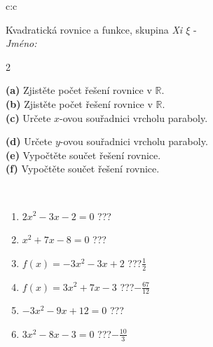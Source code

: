 \documentclass[10pt]{report}
\begin{document}
\begin{tabular}{c:c}
\begin{minipage}[c][104.5mm][t]{0.5\linewidth}
\begin{center}
\vspace{7mm}
{\huge \LARGE Kvadratická rovnice a funkce, skupina \textit{Xi $\xi$} -}\\[5mm]
\textit{Jméno:}\phantom{xxxxxxxxxxxxxxxxxxxxxxxxxxxxxxxxxxxxxxxxxxxxxxxxxxxxxxxxxxxxxxxxx}\\[5mm]
\begin{minipage}{0.95\linewidth}
\begin{center}
{\small \begin{multicols}{2} \raggedright
\textbf{(a)} Zjistěte počet řešení rovnice v \(\mathbb{R}\). \\[1mm]
\textbf{(b)} Zjistěte počet řešení rovnice v \(\mathbb{R}\). \\[1mm]
\textbf{(c)} Určete \(x\)-ovou souřadnici vrcholu paraboly. \par \columnbreak
\textbf{(d)} Určete \(y\)-ovou souřadnici vrcholu paraboly. \\[1mm]
\textbf{(e)} Vypočtěte součet řešení rovnice. \\[1mm]
\textbf{(f)} Vypočtěte součet řešení rovnice.
\end{multicols}
}
\end{center}
\end{minipage}
\\[4mm]
\begin{minipage}{0.79\linewidth}
\begin{center}
\begin{varwidth}{\linewidth}
\begin{enumerate}
\Large
\item $2x^2-3x-2=0$\quad \dotfill\; ???\;\dotfill {}
\item $x^2+7x-8=0$\quad \dotfill\; ???\;\dotfill {}
\item $f(x)=-3x^2-3x+2$\quad \dotfill\; ???\;\dotfill \quad $\frac{1}{2}$
\item $f(x)=3x^2+7x-3$\quad \dotfill\; ???\;\dotfill \quad $-\frac{67}{12}$
\item $-3x^2-9x+12=0$\quad \dotfill\; ???\;\dotfill {}
\item $3x^2-8x-3=0$\quad \dotfill\; ???\;\dotfill \quad $-\frac{10}{3}$
\end{enumerate}
\end{varwidth}
\end{center}

\end{minipage}
\end{center}
\end{minipage}
\end{tabular}
\end{document}
